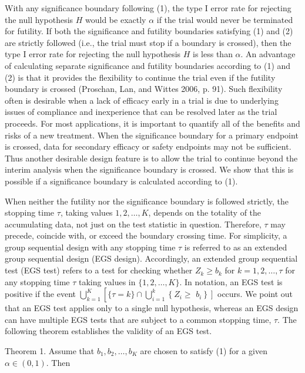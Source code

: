 \documentclass[10pt]{article}
\begin{document}
With any significance boundary following (1), the type I error rate for rejecting the null hypothesis $H$ would be exactly $\alpha$ if the trial would never be terminated for futility. If both the significance and futility boundaries satisfying (1) and (2) are strictly followed (i.e., the trial must stop if a boundary is crossed), then the type I error rate for rejecting the null hypothesis $H$ is less than $\alpha$. An advantage of calculating separate significance and futility boundaries according to (1) and (2) is that it provides the flexibility to continue the trial even if the futility boundary is crossed (Proschan, Lan, and Wittes 2006, p. 91). Such flexibility often is desirable when a lack of efficacy early in a trial is due to underlying issues of compliance and inexperience that can be resolved later as the trial proceeds. For most applications, it is important to quantify all of the benefits and risks of a new treatment. When the significance boundary for a primary endpoint is crossed, data for secondary efficacy or safety endpoints may not be sufficient. Thus another desirable design feature is to allow the trial to continue beyond the interim analysis when the significance boundary is crossed. We show that this is possible if a significance boundary is calculated according to (1).

When neither the futility nor the significance boundary is followed strictly, the stopping time $\tau$, taking values $1,2, \ldots, K$, depends on the totality of the accumulating data, not just on the test statistic in question. Therefore, $\tau$ may precede, coincide with, or exceed the boundary crossing time. For simplicity, a group sequential design with any stopping time $\tau$ is referred to as an extended group sequential design (EGS design). Accordingly, an extended group sequential test (EGS test) refers to a test for checking whether $Z_{k} \geq b_{k}$ for $k=1,2, \ldots, \tau$ for any stopping time $\tau$ taking values in $\{1,2, \ldots, K\}$. In notation, an EGS test is positive if the event $\bigcup_{k=1}^{K}\left[\{\tau=k\} \cap \bigcup_{i=1}^{k}\left\{Z_{i} \geq\right.\right.$ $\left.\left.b_{i}\right\}\right]$ occurs. We point out that an EGS test applies only to a single null hypothesis, whereas an EGS design can have multiple EGS tests that are subject to a common stopping time, $\tau$. The following theorem establishes the validity of an EGS test.

Theorem 1. Assume that $b_{1}, b_{2}, \ldots, b_{K}$ are chosen to satisfy (1) for a given $\alpha \in(0,1)$. Then
\end{document}
